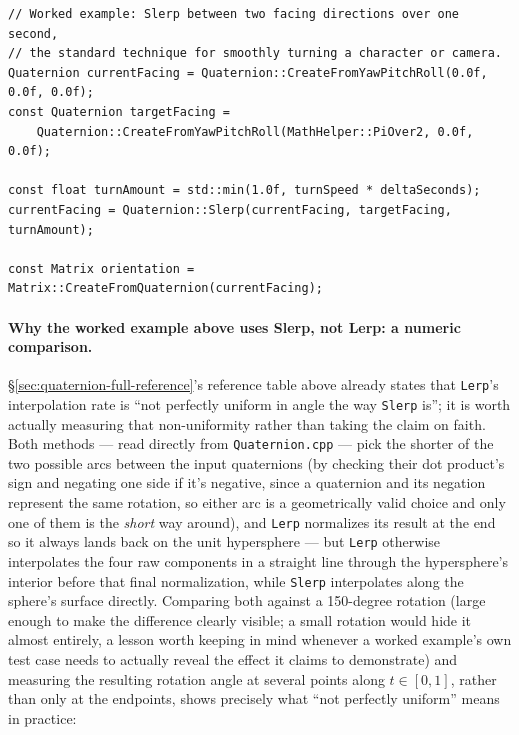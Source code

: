 \begin{lstlisting}
// Worked example: Slerp between two facing directions over one second,
// the standard technique for smoothly turning a character or camera.
Quaternion currentFacing = Quaternion::CreateFromYawPitchRoll(0.0f, 0.0f, 0.0f);
const Quaternion targetFacing =
    Quaternion::CreateFromYawPitchRoll(MathHelper::PiOver2, 0.0f, 0.0f);

const float turnAmount = std::min(1.0f, turnSpeed * deltaSeconds);
currentFacing = Quaternion::Slerp(currentFacing, targetFacing, turnAmount);

const Matrix orientation = Matrix::CreateFromQuaternion(currentFacing);
\end{lstlisting}

\paragraph{Why the worked example above uses Slerp, not Lerp: a numeric comparison.}
\S\ref{sec:quaternion-full-reference}'s reference table above already states that
\texttt{Lerp}'s interpolation rate is ``not perfectly uniform in angle the way \texttt{Slerp}
is''; it is worth actually measuring that non-uniformity rather than taking the claim on
faith. Both methods --- read directly from \texttt{Quaternion.cpp} --- pick the shorter of the
two possible arcs between the input quaternions (by checking their dot product's sign and
negating one side if it's negative, since a quaternion and its negation represent the same
rotation, so either arc is a geometrically valid choice and only one of them is the
\emph{short} way around), and \texttt{Lerp} normalizes its result at the end so it always
lands back on the unit hypersphere --- but \texttt{Lerp} otherwise interpolates the four raw
components in a
straight line through the hypersphere's interior before that final normalization, while
\texttt{Slerp} interpolates along the sphere's surface directly. Comparing both against a
150-degree rotation (large enough to make the difference clearly visible; a small rotation
would hide it almost entirely, a lesson worth keeping in mind whenever a worked example's own
test case needs to actually reveal the effect it claims to demonstrate) and measuring the
resulting rotation angle at several points along $t \in [0, 1]$, rather than only at the
endpoints, shows precisely what ``not perfectly uniform'' means in practice:

